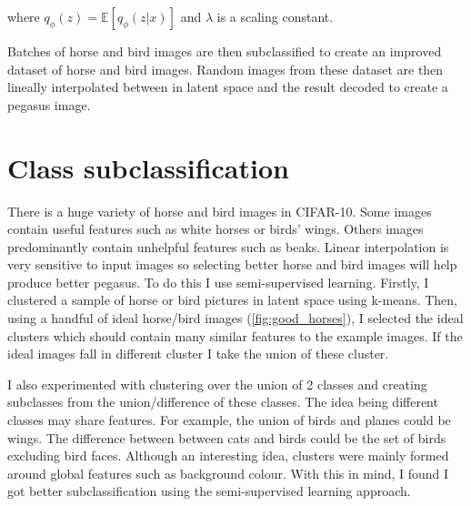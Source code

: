 \documentclass{article}
\begin{document}
where $q_\phi(z) =  \mathbb{E}[q_\phi(z|x)]$ and $\lambda$ is a scaling constant.

Batches of horse and bird images are then subclassified to create an improved dataset of horse and bird images. Random images from these dataset are then lineally interpolated between in latent space and the result decoded to create a pegasus image. 

\section{Class subclassification}
There is a huge variety of horse and bird images in CIFAR-10. Some images contain useful features such as white horses or birds' wings. Others images predominantly contain unhelpful features such as beaks. Linear interpolation is very sensitive to input images so selecting better horse and bird images will help produce better pegasus. To do this I use semi-supervised learning. Firstly, I clustered a sample of horse or bird pictures in latent space using k-means. Then, using a handful of ideal horse/bird images (\ref{fig:good_horses}), I selected the ideal clusters which should contain many similar features to the example images. If the ideal images fall in different cluster I take the union of these cluster.

I also experimented with clustering over the union of 2 classes and creating subclasses from the union/difference of these classes. The idea being different classes may share features. For example, the union of birds and planes could be wings. The difference between between cats and birds could be the set of birds excluding bird faces. Although an interesting idea, clusters were mainly formed around global features such as background colour. With this in mind, I found I got better subclassification using the semi-supervised learning approach.
\end{document}

